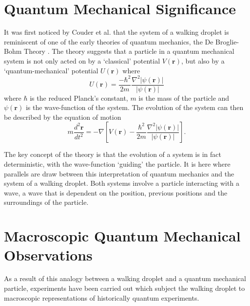 \documentclass[11pt]{article}
\begin{document}
\section{Quantum Mechanical Significance}
\label{sec:quantummechanicalsignificance}
It was first noticed by Couder et al.\cite{1} that the system of a walking droplet is reminiscent of one of the early theories of quantum mechanics, the De Broglie-Bohm Theory \cite{17}.  The theory suggests that a particle in a quantum mechanical system is not only acted on by a `classical' potential $V(\bm{r})$, but also by a `quantum-mechanical' potential $U(\bm{r})$ where
\begin{equation}
    \label{qmpotential}
    U(\bm{r})=\frac{-\hbar^2}{2m}\frac{\nabla^2\left|\psi(\bm{r})\right|}{\left|\psi(\bm{r})\right|}
\end{equation}
where $\hbar$ is the reduced Planck's constant, $m$ is the mass of the particle and $\psi(\bm{r})$ is the wave-function of the system.  The evolution of the system can then be described by the equation of motion
\begin{equation}
    \label{qmeqofmotion}
    m\frac{d^2\bm{r}}{dt^2}=-\nabla\left[V(\bm{r})-\frac{\hbar^2}{2m}\frac{\nabla^2\left|\psi(\bm{r})\right|}{\left|\psi(\bm{r})\right|}\right].
\end{equation}

The key concept of the theory is that the evolution of a system is in fact deterministic, with the wave-function `guiding' the particle.  It is here where parallels are draw between this interpretation of quantum mechanics and the system of a walking droplet.  Both systems involve a particle interacting with a wave, a wave that is dependent on the position, previous positions and the surroundings of the particle.

\section{Macroscopic Quantum Mechanical Observations}
\label{sec:macroscopicquantummechanicalobservations}
As a result of this analogy between a walking droplet and a quantum mechanical particle, experiments have been carried out which subject the walking droplet to macroscopic representations of historically quantum experiments.
\end{document}
